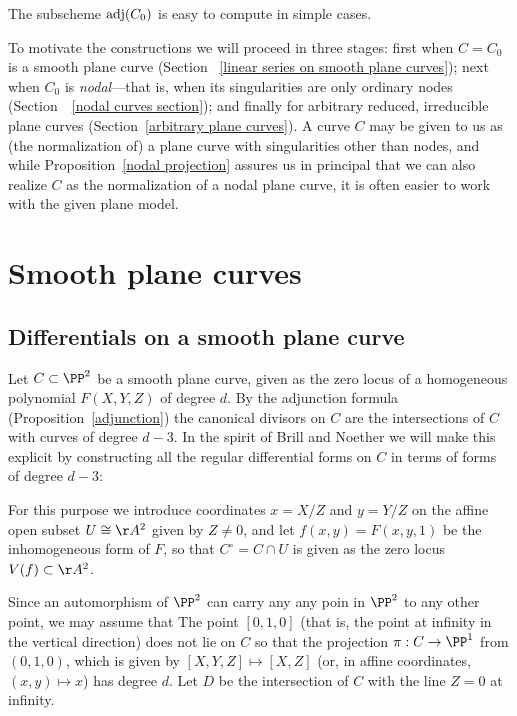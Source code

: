 The subscheme $\adj(C_{0})$ is easy to compute in simple cases.

To motivate the constructions we will proceed in three stages: first when $C = C_0$ is a smooth plane curve (Section~ \ref{linear series on smooth plane curves}); next when $C_{0}$ is \emph{nodal}---that is, when
its singularities are only ordinary nodes (Section~~\ref{nodal curves section}); and finally for arbitrary reduced, irreducible plane curves (Section~\ref{arbitrary plane curves}). A curve $C$ may be given to us as (the normalization of) a plane curve with singularities other than nodes, and while Proposition~\ref{nodal projection} assures us in principal that we can also realize $C$ as the normalization of a nodal plane curve, it is often easier to work with the given plane model. 

\section{Smooth plane curves}

\subsection{Differentials on a smooth plane curve}\label{canonical series on smooth plane curves}

Let $C \subset \PP^2$  be a smooth plane curve, given as the zero locus of a homogeneous polynomial $F(X,Y,Z)$ of degree $d$. By the adjunction formula (Proposition~\ref{adjunction}) the canonical  divisors on $C$
are the intersections of $C$ with curves of degree $d-3$. In the spirit of Brill and Noether we
will make this explicit by constructing all
 the regular differential forms on $C$ in terms of forms of degree $d-3$:


For this purpose we introduce coordinates $x = X/Z$ and $y = Y/Z$ on the affine open subset $U \cong \AA^2$ given by $Z \neq 0$, and let $f(x,y) = F(x, y,1)$ be the inhomogeneous form of $F$, so that $C^\circ = C \cap U$ is given as the zero locus $V(f) \subset  \AA^2$. 

Since an automorphism of $\PP^2$ can carry any  any poin in $\PP^{2}$ to any other point, we may assume
that 
 The point $[0,1,0]$ (that is, the point at infinity in the vertical direction) does not lie on $C$ so that the
 projection  $\pi: C \to \PP^1$ from $(0,1,0)$, which is given by $[X,Y,Z] \mapsto [X,Z]$ (or, in affine coordinates, $(x,y) \mapsto x$)  has degree $d$. Let $D$ be the intersection of $C$ with the line $Z=0$ at infinity.

